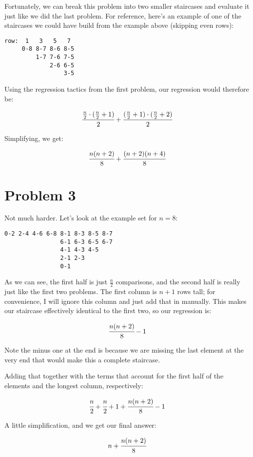 \documentclass[a4paper]{article}
\begin{document}
Fortunately, we can break this problem into two smaller staircases and evaluate it just like we did the last problem. For reference, here's an example of one of the staircases we could have build from the example above (skipping even rows):

\begin{verbatim}
row:  1   3   5   7
     0-8 8-7 8-6 8-5
         1-7 7-6 7-5
             2-6 6-5
                 3-5
\end{verbatim}

Using the regression tactics from the first problem, our regression would therefore be:

\begin{equation*}
\cfrac{\frac{n}{2} \cdot (\frac{n}{2} + 1)}{2} + \cfrac{(\frac{n}{2} + 1) \cdot (\frac{n}{2} + 2)}{2}
\end{equation*}

Simplifying, we get:

\begin{equation}
\cfrac{n(n+2)}{8} + \cfrac{(n+2)(n+4)}{8}
\end{equation}

\section*{Problem 3}

Not much harder. Let's look at the example set for $n = 8$:

\begin{verbatim}
0-2 2-4 4-6 6-8 8-1 8-3 8-5 8-7
                6-1 6-3 6-5 6-7
                4-1 4-3 4-5
                2-1 2-3
                0-1
\end{verbatim}

As we can see, the first half is just $\frac{n}{2}$ comparisons, and the second half is really just like the first two problems. The first column is $n+1$ rows tall; for convenience, I will ignore this column and just add that in manually. This makes our staircase effectively identical to the first two, so our regression is:

\begin{equation*}
\cfrac{n(n+2)}{8} - 1
\end{equation*}

Note the minus one at the end is because we are missing the last element at the very end that would make this a complete staircase.

Adding that together with the terms that account for the first half of the elements and the longest column, respectively:

\begin{equation*}
\cfrac{n}{2} + \cfrac{n}{2} + 1 + \cfrac{n(n+2)}{8} - 1
\end{equation*}

A little simplification, and we get our final answer:

\begin{equation}
n + \cfrac{n(n+2)}{8}
\end{equation}
\end{document}
